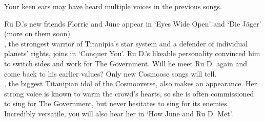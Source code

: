 
Your keen ears may have heard multiple voices in the previous songs.

Ru D.'s new friends Florrie and June appear in `Eyes Wide Open' and `Die Jäger' (more on them soon).\\

, the strongest warrior of Titanipia's star system and a defender of individual planets' rights, joins in `Conquer You'. Ru D.'s likeable personality convinced him to switch sides and work for The Government. Will he meet Ru D. again and come back to his earlier values? Only new Cosmoose songs will tell.\\

, the biggest Titanipian idol of the Cosmooverse, also makes an appearance. Her strong voice is known to warm the crowd's hearts, so she is often commissioned to sing for The Government, but never hesitates to sing for its enemies. Incredibly versatile, you will also hear her in `How June and Ru D. Met'.\\

